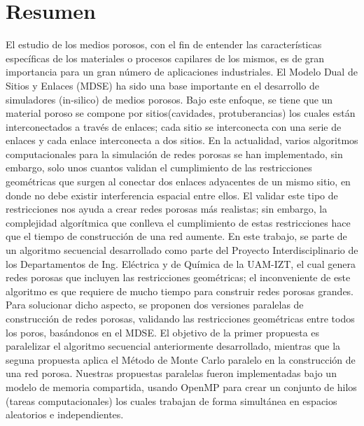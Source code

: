 \chapter{Resumen}
\bigskip
\barra
\bigskip
El estudio de los medios porosos, con el fin de entender las características específicas de los materiales o procesos capilares de los mismos, es de gran importancia para un gran número de aplicaciones industriales. El Modelo Dual de Sitios y Enlaces (MDSE) ha sido una base importante en el desarrollo de simuladores (in-silico) de medios porosos. Bajo este enfoque, se tiene que un material poroso se compone por sitios(cavidades, protuberancias) los cuales están interconectados a través de enlaces; cada sitio se interconecta con una serie de enlaces y cada enlace interconecta a dos sitios. En la actualidad, varios algoritmos computacionales para la simulación de redes porosas se han implementado, sin embargo, solo unos cuantos validan el cumplimiento de las restricciones geométricas que surgen al conectar dos enlaces adyacentes de un mismo sitio, en donde no debe existir interferencia espacial entre ellos. El validar este tipo de restricciones nos ayuda a crear redes porosas más realistas; sin embargo, la complejidad algorítmica que conlleva el cumplimiento de estas restricciones hace que el tiempo de construcción de una red aumente. En este trabajo, se parte de un algoritmo secuencial desarrollado como parte del Proyecto Interdisciplinario de los Departamentos de Ing. Eléctrica y de Química de la UAM-IZT, el cual genera redes porosas que incluyen las restricciones geométricas; el inconveniente de este algoritmo es que requiere de mucho tiempo para construir redes porosas grandes. Para solucionar dicho aspecto, se proponen dos versiones paralelas de construcción de redes porosas, validando las restricciones geométricas entre todos los poros, basándonos en el MDSE. El objetivo de la primer propuesta es paralelizar el algoritmo secuencial anteriormente desarrollado, mientras que la seguna propuesta aplica el Método de Monte Carlo paralelo en la construcción de una red porosa.  Nuestras propuestas paralelas fueron implementadas bajo un modelo de memoria compartida, usando OpenMP para crear un conjunto de hilos (tareas computacionales) los cuales trabajan de forma simultánea en espacios aleatorios e independientes.
